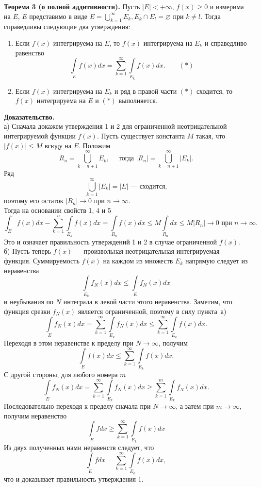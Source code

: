\documentclass[12pt,a4paper, titlepage]{article}
\begin{document}
\textbf{Теорема 3 (о полной аддитивности).} Пусть $|E| < + \infty$, $f(x) \geqslant 0 $ и измерима на $E$, $E$ представимо в виде
$E = \bigcup\limits_{k=1}^\infty E_k, E_k \cap E_l = \varnothing$ при $k \neq l$. Тогда справедливы следующие два утверждения:\\
\begin{enumerate}
\item
Если $f(x)$ интегрируема на $E$, то $f(x)$ интегрируема на $E_k$ и справедливо равенство
$$
\int\limits_E f(x) dx = \sum_{k=1}^\infty \int\limits_{E_k} f(x) dx. \qquad (*)
$$
\item
Если $f(x)$ интегрируема на $E_k$ и ряд в правой части $(*)$ сходится, то $f(x)$ интегрируема на $E$ и $(*)$ выполняется.
\end{enumerate}
\textbf{Доказательство.}\\
а) Сначала докажем утверждения 1 и 2 для ограниченной неотрицательной интегрируемой функции $f(x)$. Пусть существует константа $M$ такая, что $|f(x)| \leqslant M$ всюду на $E$. Положим
$$
R_n = \bigcup\limits_{k =n+1}^\infty E_k, \quad \mbox{ тогда } |R_n| = \bigcup\limits_{k =n+1}^\infty |E_k|.
$$
Ряд
$$\bigcup\limits_{k =1}^\infty |E_k| = |E| \mbox{ --- сходится,}
$$
поэтому его остаток $|R_n| \to 0$ при $n \to \infty$.\\

Тогда на основании свойств 1, 4 и 5
$$
\int_E f(x) dx - \sum_{k=1}^n \int\limits_{E_k} f(x) dx = \int\limits_{R_n} f(x) dx \leqslant M \int\limits_{R_n} dx \leqslant M |R_n| \to 0 \mbox{ при } n \to \infty.
$$
Это и означает правильность утверждений 1 и 2 в случае ограниченной $f(x)$.\\

б) Пусть теперь $f(x)$ --- произвольная неотрицательная интегрируемая функция. Суммируемость $f(x)$ на каждом из множеств $E_k$ напрямую следует из неравенства
$$
\int\limits_{E_k} f_N(x) dx \leqslant \int\limits_E f_N(x) dx
$$
и неубывания по $N$ интеграла в левой части этого неравенства. Заметим, что функция срезки $f_N(x)$ является ограниченной, поэтому в силу пункта~а) 
$$
\int\limits_E f_N(x) dx = \sum_{k=1}^\infty \int\limits_{E_k} f_N(x) dx \leqslant \sum_{k=1}^\infty \int\limits_{E_k} f(x) dx.
$$
Переходя в этом неравенстве к пределу при $N \to \infty$, получим
$$
\int\limits_E f(x) dx \leqslant \sum_{k=1}^\infty \int\limits_{E_k} f(x) dx.
$$
С другой стороны, для любого номера $m$
$$
\int\limits_E f_N(x) dx = \sum_{k=1}^\infty \int\limits_{E_k} f_N(x) dx \geqslant \sum_{k=1}^m \int\limits_{E_k} f_N(x) dx.
$$
Последовательно переходя к пределу сначала при $N \to \infty$, а затем при $m \to \infty$, получим неравенство
$$
\int\limits_E f dx \geqslant \sum_{k=1}^\infty \int\limits_{E_k} f(x) dx
$$
Из двух полученных нами неравенств следует, что
$$
\int\limits_E f dx = \sum_{k=1}^\infty \int\limits_{E_k} f(x) dx,
$$
что и доказывает правильность утверждения 1.\\
\end{document}

